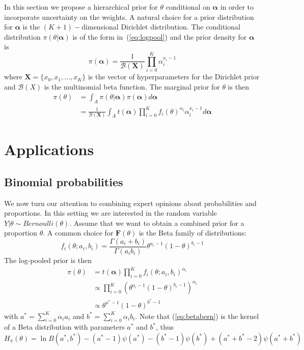 \documentclass[a4paper, notitlepage, 11pt]{article}
\begin{document}
In this section we propose a hierarchical prior for $\theta$ conditional on $\boldsymbol\alpha$ in order to incorporate uncertainty on the weights.
A natural choice for a prior distribution for $\boldsymbol\alpha$ is the $(K+1)-$dimensional Dirichlet distribution.
The conditional distribution $\pi(\theta|\boldsymbol\alpha)$ is of the form in~(\ref{eq:logpool}) and the prior density for $\boldsymbol\alpha$ is 
\begin{equation}
 \label{eq:generalcondprior}
 \pi(\boldsymbol\alpha) = \frac{1}{\mathcal{B}(\boldsymbol X)}\prod_{i=0}^K \alpha_i^{x_i-1}
\end{equation}
where $\boldsymbol X = \{ x_0, x_1, \ldots, x_K\}$ is the vector of hyperparameters for the Dirichlet prior and $\mathcal{B}(X)$ is the multinomial beta function.
The marginal prior for $\theta$ is then
\begin{align}
 \label{eq:marginalhierprior}
 \pi(\theta) &= \int_{A}\pi(\theta|\boldsymbol\alpha)\pi(\boldsymbol\alpha)d\boldsymbol\alpha \\
             &= \frac{1}{\mathcal{B}(\boldsymbol X)}\int_{A}t(\boldsymbol\alpha)\prod_{i=0}^K f_i(\theta)^{\alpha_i}\alpha_i^{x_i-1}d\boldsymbol\alpha 
\end{align}


\section*{Applications}
\label{sec:apps}

\subsection*{Binomial probabilities}
\label{sec:beta}
We now turn our attention to combining expert opinions about probabilities and proportions.
In this setting we are interested in the random variable $Y | \theta \sim Bernoulli(\theta)$.
Assume that we want to obtain a combined prior for a proportion $\theta$.
A common choice for $\mathbf{F}(\theta)$ is the Beta family of distributions:
$$f_i(\theta;a_i, b_i) = \frac{\Gamma(a_i + b_i)}{\Gamma(a_i b_i)} \theta^{a_i-1}(1-\theta)^{b_i-1}$$
The log-pooled prior is then
\begin{align}
\pi(\theta)&= t(\boldsymbol\alpha)\prod_{i=0}^{K}f_i(\theta;a_i,b_i)^{\alpha_i}\\
&\propto \prod_{i=0}^{K} \left(\theta^{a_i-1}(1-\theta)^{b_i-1} \right)^{\alpha_i}\\
\label{eq:betabern}
&\propto \theta^{a^*-1}(1-\theta)^{b^*-1}
\end{align}
with $a^* =\sum_{i=0}^{K}\alpha_ia_i$ and $b^* = \sum_{i=0}^{K}\alpha_ib_i$.
Note that (\ref{eq:betabern}) is the kernel of a Beta distribution with parameters $a^*$ and $b^*$, thus 
\begin{equation}
 \label{eq:entropybeta}
 H_{\pi}(\theta) = \ln B(a^*,b^*) - (a^*-1)\psi(a^*) - (b^*-1)\psi(b^*) + (a^*+b^* -2)\psi(a^*+b^*)
\end{equation}
\end{document}
